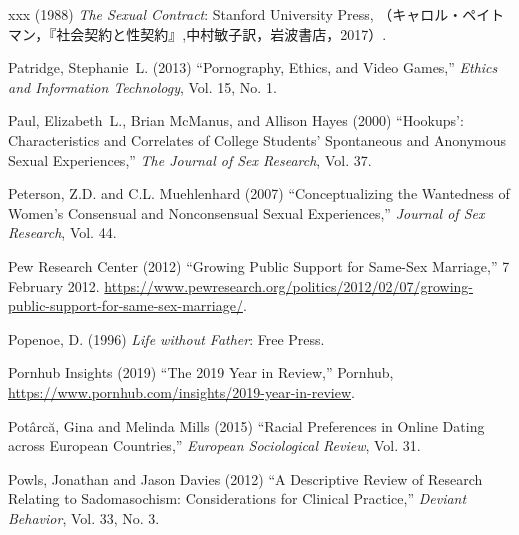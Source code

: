 \documentclass[]{jlreq} \usepackage{mystyle}
\begin{document}
\begin{thebibliography}{xxx}
 \bysame{}  (1988)  \textit{ The Sexual Contract}: Stanford University Press,
  （キャロル・ペイトマン，『社会契約と性契約』,中村敏子訳，岩波書店，2017）.

Patridge, Stephanie~L. (2013) ``Pornography, Ethics, and Video Games,''
  \textit{ Ethics and Information Technology}, Vol. 15, No. 1.

Paul, Elizabeth~L., Brian McManus, and Allison Hayes (2000) ``Hookups':
  Characteristics and Correlates of College Students' Spontaneous and Anonymous
  Sexual Experiences,'' \textit{ The Journal of Sex Research}, Vol. 37.

Peterson, Z.D. and C.L. Muehlenhard (2007) ``Conceptualizing the Wantedness of
  Women's Consensual and Nonconsensual Sexual Experiences,'' \textit{ Journal
  of Sex Research}, Vol. 44.

{Pew Research Center} (2012) ``Growing Public Support for Same-Sex Marriage,''
  7 February 2012.
  \url{https://www.pewresearch.org/politics/2012/02/07/growing-public-support-for-same-sex-marriage/}.

Popenoe, D. (1996)  \textit{ Life without Father}: Free Press.

{Pornhub Insights} (2019) ``The 2019 Year in Review,'' Pornhub,
  \url{https://www.pornhub.com/insights/2019-year-in-review}.

Pot{\^a}rc\u{a}, Gina and Melinda Mills (2015) ``Racial Preferences in Online
  Dating across European Countries,'' \textit{ European Sociological Review},
  Vol. 31.

Powls, Jonathan and Jason Davies (2012) ``A Descriptive Review of Research
  Relating to Sadomasochism: Considerations for Clinical Practice,'' \textit{
  Deviant Behavior}, Vol. 33, No. 3.


\end{thebibliography}
\end{document}
